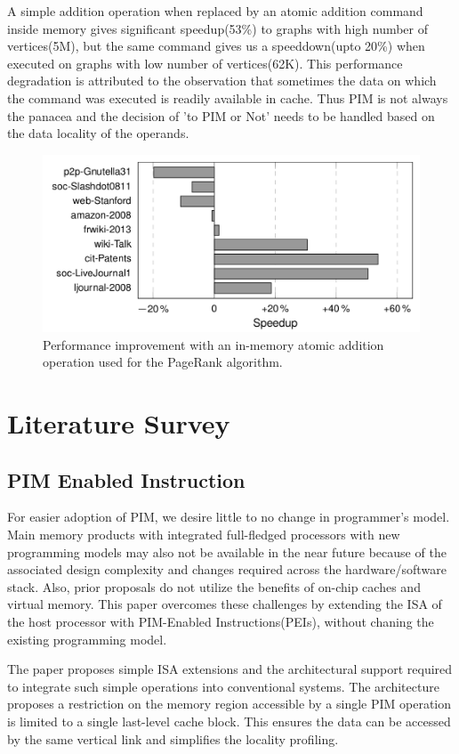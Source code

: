 \documentclass[a4paper,12pt, final]{report}
\begin{document}
A simple addition operation when replaced by an atomic addition command inside
memory gives significant speedup(53\%) to graphs with high number of vertices(5M), but
the same command gives us a speeddown(upto 20\%) when executed on graphs with low number
of vertices(62K). This performance degradation is attributed to the observation
that sometimes the data on which the command was executed is readily available in
cache. Thus PIM is not always the panacea and the decision of 'to PIM or Not'
needs to be handled based on the data locality of the operands.
\begin{figure}[h]
  \centering
  \includegraphics[width=0.8\linewidth]{pim_add.png}
  \caption{Performance improvement with an in-memory atomic addition operation
  used for the PageRank algorithm.}
\end{figure}

\chapter{Literature Survey}
\section{PIM Enabled Instruction}
For easier adoption of PIM, we desire little to no change in programmer's model.
Main memory products with integrated full-fledged processors with new
programming models may also not be available in the near future because of the
associated design complexity and changes required across the hardware/software
stack. Also, prior proposals do not utilize the benefits of on-chip caches and
virtual memory. This paper overcomes these challenges by extending the ISA of
the host processor with PIM-Enabled Instructions(PEIs)\cite{PEI_ISCA}, without chaning the
existing programming model. 


The paper proposes simple ISA extensions and the architectural support required
to integrate such simple operations into conventional systems.
The architecture proposes a restriction on the memory region accessible by
a single PIM operation is limited to a single last-level cache block. This
ensures the data can be accessed by the same vertical link and simplifies the
locality profiling.
\end{document}
